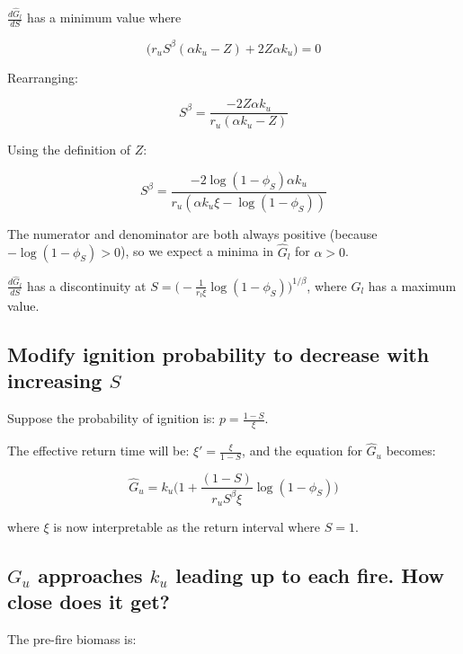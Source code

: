 \documentclass{article}
\begin{document}
     $\frac{d \hat{G}_l}{dS}$  has a minimum value where
    
      \begin{equation}
      \big( {r_u} S^{\beta }(\alpha  {k_u}  - Z) +2 Z \alpha  {k_u}
       \big) = 0
    \end{equation}
    
    Rearranging:
    
      \begin{equation}
     S^{\beta } = \frac{-2 Z \alpha  {k_u} }{{r_u}(\alpha  {k_u}  - Z)  }
    \end{equation}
    
    Using the definition of $Z$:
    
      \begin{equation}
     S^{\beta } = \frac{-2 {\log({1-\phi_S})} \alpha  {k_u} }{{r_u}(\alpha  {k_u} \xi - {\log({1-\phi_S})})  }
    \end{equation}
    
    The numerator and denominator are both always positive (because $- \log(1-\phi_S) > 0$), so we expect a minima in $\hat G_l$ for $\alpha > 0$.
    
     $\frac{d \hat{G}_l}{dS}$ has a discontinuity at  $ S = \big( - \frac{1}{r_l \xi }\log (1 - \phi_S)\big)^{1/\beta}$, where $G_l$ has a maximum value.
    

\subsection*{Modify ignition probability to decrease with increasing $S$}

Suppose the probability of ignition is: $p = \frac{1-S}{\xi}$.

The effective return time will be: $\xi' = \frac{\xi} { 1- S}$, and the equation for $\hat{G}_u $ becomes:

\begin{equation}
\hat{G}_u =
  k_u \big( 1 + \frac{(1-S)}{r_u S^\beta \xi} \log(1-\phi_S) \big)
\end{equation}

where $\xi$ is now interpretable as the return interval where $S=1$.

 \subsection*{ $G_u$ approaches $k_u$  leading up to each fire. How close does it get?}

The  pre-fire biomass is:
\end{document}
